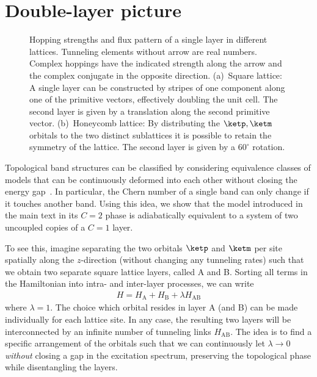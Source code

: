\section{Double-layer picture}

\begin{figure}[t]
    \centering

    \caption{
        Hopping strengths and flux pattern of a single layer in different lattices.
        Tunneling elements without arrow are real numbers.
        Complex hoppings have the indicated strength along the arrow and the complex conjugate in the opposite direction.
        (a)~Square lattice: A single layer can be constructed by stripes of one component along one of the primitive vectors, effectively doubling the unit cell.
        The second layer is given by a translation along the second primitive vector.
        (b)~Honeycomb lattice: By distributing the $\ketp, \ketm$ orbitals to the two distinct sublattices it is possible to retain the symmetry of the lattice.
        The second layer is given by a $60^\circ$ rotation.
    }
\end{figure}

Topological band structures can be classified by considering equivalence classes of models that can be continuously deformed into each other without closing the energy gap~\cite{Hasan2010}.
In particular, the Chern number of a single band can only change if it touches another band.
Using this idea, we show that the model introduced in the main text in its $C=2$ phase is adiabatically equivalent to a system of two uncoupled copies of a $C=1$ layer.

To see this, imagine separating the two orbitals $\ketp$ and $\ketm$ per site spatially along the $z$-direction (without changing any tunneling rates) such that we obtain two separate square lattice layers, called A and B.
Sorting all terms in the Hamiltonian into intra- and inter-layer processes, we can write
\begin{align}
H=H_\text{A} + H_\text{B} + \lambda H_\text{AB}
\end{align}
where $\lambda=1$.
The choice which orbital resides in layer A (and B) can be made individually for each lattice site.
In any case, the resulting two layers will be interconnected by an infinite number of tunneling links $H_\text{AB}$.
The idea is to find a specific arrangement of the orbitals such that we can continuously let $\lambda \longrightarrow 0$ \emph{without} closing a gap in the excitation spectrum, preserving the topological phase while disentangling the layers.

